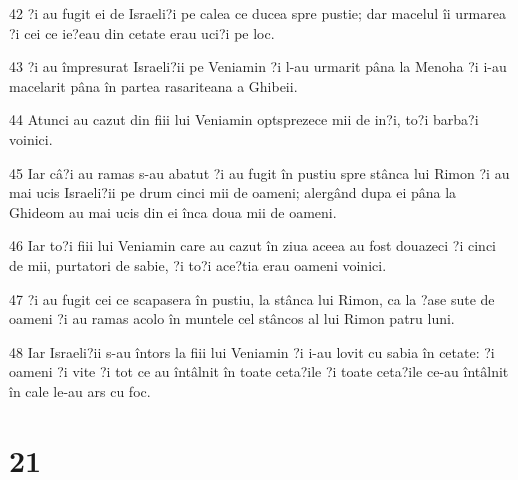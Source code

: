 \par 42 ?i au fugit ei de Israeli?i pe calea ce ducea spre pustie; dar macelul îi urmarea ?i cei ce ie?eau din cetate erau uci?i pe loc.
\par 43 ?i au împresurat Israeli?ii pe Veniamin ?i l-au urmarit pâna la Menoha ?i i-au macelarit pâna în partea rasariteana a Ghibeii.
\par 44 Atunci au cazut din fiii lui Veniamin optsprezece mii de in?i, to?i barba?i voinici.
\par 45 Iar câ?i au ramas s-au abatut ?i au fugit în pustiu spre stânca lui Rimon ?i au mai ucis Israeli?ii pe drum cinci mii de oameni; alergând dupa ei pâna la Ghideom au mai ucis din ei înca doua mii de oameni.
\par 46 Iar to?i fiii lui Veniamin care au cazut în ziua aceea au fost douazeci ?i cinci de mii, purtatori de sabie, ?i to?i ace?tia erau oameni voinici.
\par 47 ?i au fugit cei ce scapasera în pustiu, la stânca lui Rimon, ca la ?ase sute de oameni ?i au ramas acolo în muntele cel stâncos al lui Rimon patru luni.
\par 48 Iar Israeli?ii s-au întors la fiii lui Veniamin ?i i-au lovit cu sabia în cetate: ?i oameni ?i vite ?i tot ce au întâlnit în toate ceta?ile ?i toate ceta?ile ce-au întâlnit în cale le-au ars cu foc.

\chapter{21}


